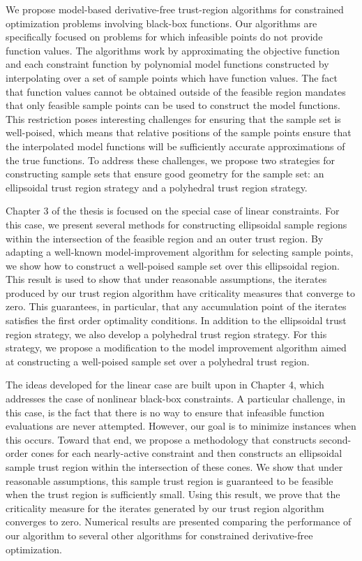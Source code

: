 
We propose model-based derivative-free trust-region algorithms for constrained optimization problems involving black-box functions.
Our algorithms are specifically focused on problems for which infeasible points do not provide function values.
The algorithms work by approximating the objective function and each constraint function by polynomial model functions 
constructed by interpolating over a set of sample points which have function values.
The fact that function values cannot be obtained outside of the feasible region mandates that 
only feasible sample points can be used to construct the model functions.
This restriction poses interesting challenges for ensuring that the sample set is well-poised, 
which means that relative positions of the sample points ensure that the interpolated model functions will be
sufficiently accurate approximations of the true functions.
To address these challenges, we propose two strategies for constructing sample sets that ensure good geometry for the sample set: 
an ellipsoidal trust region strategy and a polyhedral trust region strategy.   

Chapter 3 of the thesis is focused on the special case of linear constraints.
For this case, we present several methods for constructing ellipsoidal sample regions within the intersection of the feasible region and an outer trust region.
By adapting a well-known model-improvement algorithm for selecting sample points,
we show how to construct a well-poised sample set over this ellipsoidal region.
This result is used to show that under reasonable assumptions,  
the iterates produced by our trust region algorithm have criticality measures that converge to zero.
This guarantees, in particular, that any accumulation point of the iterates satisfies the first order optimality conditions.
In addition to the ellipsoidal trust region strategy, we also develop a polyhedral trust region strategy.
For this strategy, we propose a modification to the model improvement algorithm aimed at constructing a well-poised sample set over 
a polyhedral trust region.

The ideas developed for the linear case are built upon in Chapter 4, which addresses the case of nonlinear black-box constraints.
A particular challenge, in this case, is the fact that there is no way to ensure that infeasible function evaluations are never attempted.
However, our goal is to minimize instances when this occurs.
Toward that end, we propose a methodology that constructs second-order cones for each nearly-active constraint 
and then constructs an ellipsoidal sample trust region within the intersection of these cones.
We show that under reasonable assumptions, this sample trust region is guaranteed to be feasible when the trust region is sufficiently small.
Using this result, we prove that the criticality measure for the iterates generated by our trust region algorithm converges to zero.
Numerical results are presented comparing the performance of our algorithm to several other algorithms for constrained derivative-free optimization.
 
